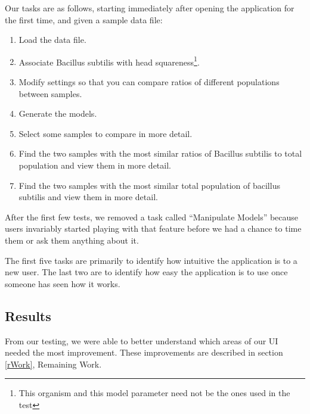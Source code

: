 \documentclass[letterpaper,10pt, onecolumn, draftclsnofoot]{IEEEtran}
\begin{document}
Our tasks are as follows, starting immediately after opening the application for the first time, and given a sample data file:
\begin{enumerate}
	\item Load the data file.
	\item Associate Bacillus subtilis with head squareness\footnote{This organism and this model parameter need not be the ones used in the test}.
	\item Modify settings so that you can compare ratios of different populations between samples.
	\item Generate the models.
	\item Select some samples to compare in more detail.
	\item Find the two samples with the most similar ratios of Bacillus subtilis to total population and view them in more detail.
	\item Find the two samples with the most similar total population of bacillus subtilis and view them in more detail.
\end{enumerate}

After the first few tests, we removed a task called ``Manipulate Models'' because users invariably started playing with that feature before we had a chance to time them or ask them anything about it.

The first five tasks are primarily to identify how intuitive the application is to a new user. The last two are to identify how easy the application is to use once someone has seen how it works.

\subsection{Results}

From our testing, we were able to better understand which areas of our UI needed the most improvement. These improvements are described in section \ref{rWork}, Remaining Work.
\end{document}
